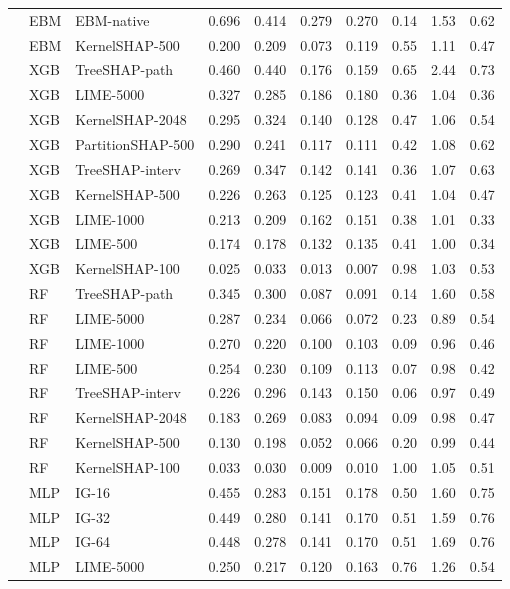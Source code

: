 \begin{longtable}{lllrrrrrrr}
 & EBM & EBM-native & 0.696 & 0.414 & 0.279 & 0.270 & 0.14 & 1.53 & 0.62 \\
 & EBM & KernelSHAP-500 & 0.200 & 0.209 & 0.073 & 0.119 & 0.55 & 1.11 & 0.47 \\
 & XGB & TreeSHAP-path & 0.460 & 0.440 & 0.176 & 0.159 & 0.65 & 2.44 & 0.73 \\
 & XGB & LIME-5000 & 0.327 & 0.285 & 0.186 & 0.180 & 0.36 & 1.04 & 0.36 \\
 & XGB & KernelSHAP-2048 & 0.295 & 0.324 & 0.140 & 0.128 & 0.47 & 1.06 & 0.54 \\
 & XGB & PartitionSHAP-500 & 0.290 & 0.241 & 0.117 & 0.111 & 0.42 & 1.08 & 0.62 \\
 & XGB & TreeSHAP-interv & 0.269 & 0.347 & 0.142 & 0.141 & 0.36 & 1.07 & 0.63 \\
 & XGB & KernelSHAP-500 & 0.226 & 0.263 & 0.125 & 0.123 & 0.41 & 1.04 & 0.47 \\
 & XGB & LIME-1000 & 0.213 & 0.209 & 0.162 & 0.151 & 0.38 & 1.01 & 0.33 \\
 & XGB & LIME-500 & 0.174 & 0.178 & 0.132 & 0.135 & 0.41 & 1.00 & 0.34 \\
 & XGB & KernelSHAP-100 & 0.025 & 0.033 & 0.013 & 0.007 & 0.98 & 1.03 & 0.53 \\
 & RF & TreeSHAP-path & 0.345 & 0.300 & 0.087 & 0.091 & 0.14 & 1.60 & 0.58 \\
 & RF & LIME-5000 & 0.287 & 0.234 & 0.066 & 0.072 & 0.23 & 0.89 & 0.54 \\
 & RF & LIME-1000 & 0.270 & 0.220 & 0.100 & 0.103 & 0.09 & 0.96 & 0.46 \\
 & RF & LIME-500 & 0.254 & 0.230 & 0.109 & 0.113 & 0.07 & 0.98 & 0.42 \\
 & RF & TreeSHAP-interv & 0.226 & 0.296 & 0.143 & 0.150 & 0.06 & 0.97 & 0.49 \\
 & RF & KernelSHAP-2048 & 0.183 & 0.269 & 0.083 & 0.094 & 0.09 & 0.98 & 0.47 \\
 & RF & KernelSHAP-500 & 0.130 & 0.198 & 0.052 & 0.066 & 0.20 & 0.99 & 0.44 \\
 & RF & KernelSHAP-100 & 0.033 & 0.030 & 0.009 & 0.010 & 1.00 & 1.05 & 0.51 \\
 & MLP & IG-16 & 0.455 & 0.283 & 0.151 & 0.178 & 0.50 & 1.60 & 0.75 \\
 & MLP & IG-32 & 0.449 & 0.280 & 0.141 & 0.170 & 0.51 & 1.59 & 0.76 \\
 & MLP & IG-64 & 0.448 & 0.278 & 0.141 & 0.170 & 0.51 & 1.69 & 0.76 \\
 & MLP & LIME-5000 & 0.250 & 0.217 & 0.120 & 0.163 & 0.76 & 1.26 & 0.54 \\

\end{longtable}
